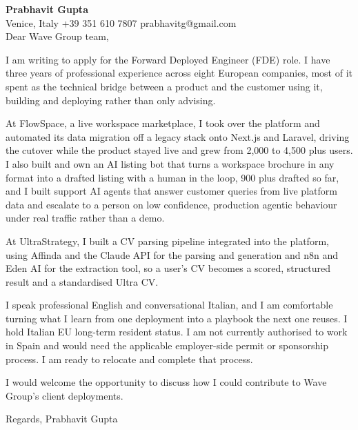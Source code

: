 \documentclass[a4paper,10.5pt]{article}
\begin{document}
\textbf{Prabhavit Gupta}\\
Venice, Italy \textbar{} +39 351 610 7807 \textbar{} prabhavitg@gmail.com\\[10pt]
Dear Wave Group team,

I am writing to apply for the Forward Deployed Engineer (FDE) role. I have three years of professional experience across eight European companies, most of it spent as the technical bridge between a product and the customer using it, building and deploying rather than only advising.

At FlowSpace, a live workspace marketplace, I took over the platform and automated its data migration off a legacy stack onto Next.js and Laravel, driving the cutover while the product stayed live and grew from 2,000 to 4,500 plus users. I also built and own an AI listing bot that turns a workspace brochure in any format into a drafted listing with a human in the loop, 900 plus drafted so far, and I built support AI agents that answer customer queries from live platform data and escalate to a person on low confidence, production agentic behaviour under real traffic rather than a demo.

At UltraStrategy, I built a CV parsing pipeline integrated into the platform, using Affinda and the Claude API for the parsing and generation and n8n and Eden AI for the extraction tool, so a user's CV becomes a scored, structured result and a standardised Ultra CV.

I speak professional English and conversational Italian, and I am comfortable turning what I learn from one deployment into a playbook the next one reuses. I hold Italian EU long-term resident status. I am not currently authorised to work in Spain and would need the applicable employer-side permit or sponsorship process. I am ready to relocate and complete that process.

I would welcome the opportunity to discuss how I could contribute to Wave Group's client deployments.

Regards,
Prabhavit Gupta
\end{document}
